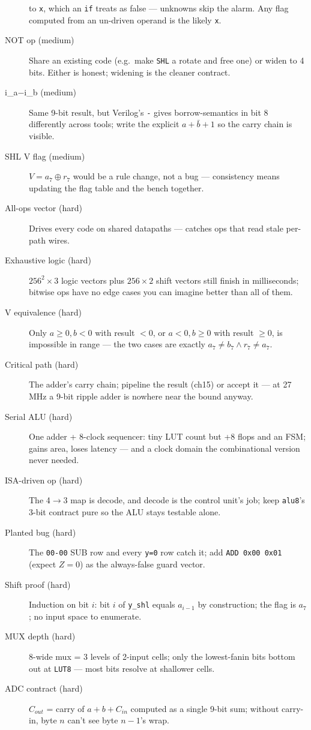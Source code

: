 \begin{description}
to \texttt{x}, which an \texttt{if} treats as false --- unknowns skip
the alarm. Any flag computed from an un-driven operand is the likely
\texttt{x}.
\item[NOT op (medium)] Share an existing code (e.g.\ make
\texttt{SHL} a rotate and free one) or widen to 4 bits. Either is
honest; widening is the cleaner contract.
\item[i\_a$-$i\_b (medium)] Same 9-bit result, but Verilog's
\texttt{-} gives borrow-semantics in bit 8 differently across tools;
write the explicit $a+\bar b+1$ so the carry chain is visible.
\item[SHL V flag (medium)] $V=a_7\oplus r_7$ would be a rule change,
not a bug --- consistency means updating the flag table and the bench
together.
\item[All-ops vector (hard)] Drives every code on shared datapaths ---
catches ops that read stale per-path wires.
\item[Exhaustive logic (hard)] $256^2\times3$ logic vectors plus
$256\times2$ shift vectors still finish in milliseconds; bitwise ops
have no edge cases you can imagine better than all of them.
\item[V equivalence (hard)] Only $a\geq0,b<0$ with result $<0$, or
$a<0,b\geq0$ with result $\geq0$, is impossible in range --- the two
cases are exactly $a_7\neq b_7 \wedge r_7\neq a_7$.
\item[Critical path (hard)] The adder's carry chain; pipeline the
result (ch15) or accept it --- at 27\,MHz a 9-bit ripple adder is
nowhere near the bound anyway.
\item[Serial ALU (hard)] One adder + 8-clock sequencer: tiny LUT count
but +8 flops and an FSM; gains area, loses latency --- and a clock
domain the combinational version never needed.
\item[ISA-driven op (hard)] The 4$\to$3 map is decode, and decode is
the control unit's job; keep \texttt{alu8}'s 3-bit contract pure so
the ALU stays testable alone.
\item[Planted bug (hard)] The \texttt{00-00} SUB row and every
\texttt{y=0} row catch it; add \texttt{ADD 0x00 0x01} (expect $Z=0$)
as the always-false guard vector.
\item[Shift proof (hard)] Induction on bit $i$: bit $i$ of
\texttt{y\_shl} equals $a_{i-1}$ by construction; the flag is $a_7$;
no input space to enumerate.
\item[MUX depth (hard)] 8-wide mux = 3 levels of 2-input cells; only
the lowest-fanin bits bottom out at \texttt{LUT8} --- most bits
resolve at shallower cells.
\item[ADC contract (hard)] $C_{out}$ = carry of $a+b+C_{in}$
computed as a single 9-bit sum; without carry-in, byte $n$ can't see
byte $n-1$'s wrap.
\end{description}

